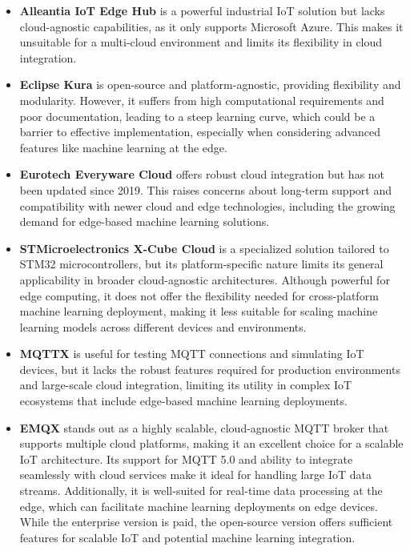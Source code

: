 \begin{itemize}
    \item \textbf{Alleantia IoT Edge Hub} is a powerful industrial IoT solution but lacks cloud-agnostic capabilities, as it only supports Microsoft Azure. This makes it unsuitable for a multi-cloud environment and limits its flexibility in cloud integration.

    \item \textbf{Eclipse Kura} is open-source and platform-agnostic, providing flexibility and modularity. However, it suffers from high computational requirements and poor documentation, leading to a steep learning curve, which could be a barrier to effective implementation, especially when considering advanced features like machine learning at the edge.

    \item \textbf{Eurotech Everyware Cloud} offers robust cloud integration but has not been updated since 2019. This raises concerns about long-term support and compatibility with newer cloud and edge technologies, including the growing demand for edge-based machine learning solutions.

    \item \textbf{STMicroelectronics X-Cube Cloud} is a specialized solution tailored to STM32 microcontrollers, but its platform-specific nature limits its general applicability in broader cloud-agnostic architectures. Although powerful for edge computing, it does not offer the flexibility needed for cross-platform machine learning deployment, making it less suitable for scaling machine learning models across different devices and environments.

    \item \textbf{MQTTX} is useful for testing MQTT connections and simulating IoT devices, but it lacks the robust features required for production environments and large-scale cloud integration, limiting its utility in complex IoT ecosystems that include edge-based machine learning deployments.

    \item \textbf{EMQX} stands out as a highly scalable, cloud-agnostic MQTT broker that supports multiple cloud platforms, making it an excellent choice for a scalable IoT architecture. Its support for MQTT 5.0 and ability to integrate seamlessly with cloud services make it ideal for handling large IoT data streams. Additionally, it is well-suited for real-time data processing at the edge, which can facilitate machine learning deployments on edge devices. While the enterprise version is paid, the open-source version offers sufficient features for scalable IoT and potential machine learning integration.


\end{itemize}
